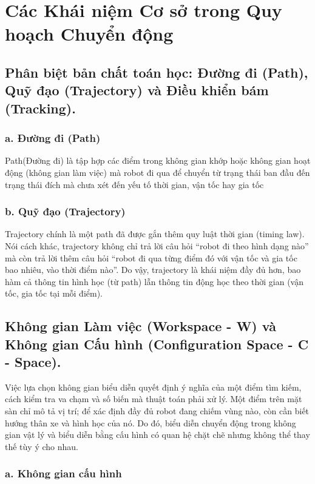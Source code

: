 \documentclass[12pt,a4paper,oneside]{report}
\begin{document}
\section{Các Khái niệm Cơ sở trong Quy hoạch Chuyển động}

\subsection{Phân biệt bản chất toán học: Đường đi (Path), Quỹ đạo (Trajectory) và Điều khiển bám (Tracking).}

\subsubsection*{a. Đường đi (Path)}
Path(Đường đi) là tập hợp các điểm trong không gian khớp hoặc không gian hoạt động (không gian làm việc) mà robot đi qua để chuyển từ trạng thái ban đầu đến trạng thái đích mà chưa xét đến yếu tố thời gian, vận tốc hay gia tốc
\subsubsection*{b. Quỹ đạo (Trajectory)}

Trajectory chính là một path đã được gắn thêm quy luật thời gian (timing law). Nói cách khác, trajectory không chỉ trả lời câu hỏi ``robot đi theo hình dạng nào'' mà còn trả lời thêm câu hỏi ``robot đi qua từng điểm đó với vận tốc và gia tốc bao nhiêu, vào thời điểm nào''. Do vậy, trajectory là khái niệm đầy đủ hơn, bao hàm cả thông tin hình học (từ path) lẫn thông tin động học theo thời gian (vận tốc, gia tốc tại mỗi điểm).


\subsection{Không gian Làm việc (Workspace - W) và Không gian Cấu hình (Configuration Space - C - Space).}

Việc lựa chọn không gian biểu diễn quyết định ý nghĩa của một điểm tìm kiếm, cách kiểm tra va chạm và số biến mà thuật toán phải xử lý. Một điểm trên mặt sàn chỉ mô tả vị trí; để xác định đầy đủ robot đang chiếm vùng nào, còn cần biết hướng thân xe và hình học của nó. Do đó, biểu diễn chuyển động trong không gian vật lý và biểu diễn bằng cấu hình có quan hệ chặt chẽ nhưng không thể thay thế tùy ý cho nhau.

\subsubsection*{a. Không gian cấu hình}
\end{document}
